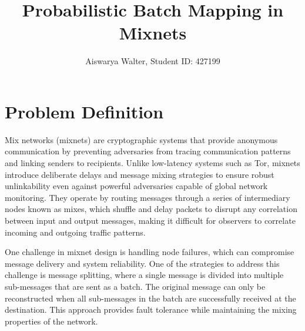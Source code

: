 \documentclass{article}
\title{Probabilistic Batch Mapping in Mixnets}
\author{Aiswarya Walter, Student ID: 427199}
\date{}
\begin{document}
\maketitle

\section{Problem Definition}
\label{sec:problem}

Mix networks (mixnets) are cryptographic systems that 
provide anonymous communication by preventing 
adversaries from tracing communication patterns and 
linking senders to recipients. Unlike low-latency 
systems such as Tor, mixnets introduce deliberate 
delays and message mixing strategies to ensure 
robust unlinkability even against powerful 
adversaries capable of global network monitoring. 
They operate by routing messages through a series 
of intermediary nodes known as mixes, which 
shuffle and delay packets to disrupt any 
correlation between input and output messages, 
making it difficult for observers to correlate 
incoming and outgoing traffic patterns.



One challenge in mixnet design is handling node failures, which 
can compromise message delivery and system reliability. One of the strategies 
to address this challenge is message splitting, where a single  
message is divided into multiple sub-messages that are sent as a batch. 
The original message can only be reconstructed when all sub-messages in 
the batch are successfully received at the destination. This approach 
provides fault tolerance while maintaining the mixing properties of 
the network.

\end{document}
